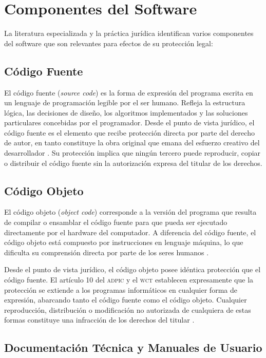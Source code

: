 \documentclass[11pt,a4paper]{report}
\begin{document}
\section{Componentes del Software}

La literatura especializada y la práctica jurídica identifican varios componentes del software que son relevantes para efectos de su protección legal:

\subsection{Código Fuente}

El código fuente (\textit{source code}) es la forma de expresión del programa escrita en un lenguaje de programación legible por el ser humano. Refleja la estructura lógica, las decisiones de diseño, los algoritmos implementados y las soluciones particulares concebidas por el programador. Desde el punto de vista jurídico, el código fuente es el elemento que recibe protección directa por parte del derecho de autor, en tanto constituye la obra original que emana del esfuerzo creativo del desarrollador \citep{ompi2024}. Su protección implica que ningún tercero puede reproducir, copiar o distribuir el código fuente sin la autorización expresa del titular de los derechos.

\subsection{Código Objeto}

El código objeto (\textit{object code}) corresponde a la versión del programa que resulta de compilar o ensamblar el código fuente para que pueda ser ejecutado directamente por el hardware del computador. A diferencia del código fuente, el código objeto está compuesto por instrucciones en lenguaje máquina, lo que dificulta su comprensión directa por parte de los seres humanos \citep{ompi2024}.

Desde el punto de vista jurídico, el código objeto posee idéntica protección que el código fuente. El artículo 10 del \textsc{adpic} y el \textsc{wct} establecen expresamente que la protección se extiende a los programas informáticos en cualquier forma de expresión, abarcando tanto el código fuente como el código objeto. Cualquier reproducción, distribución o modificación no autorizada de cualquiera de estas formas constituye una infracción de los derechos del titular \citep{omc1994, ompi1996}.

\subsection{Documentación Técnica y Manuales de Usuario}
\end{document}
